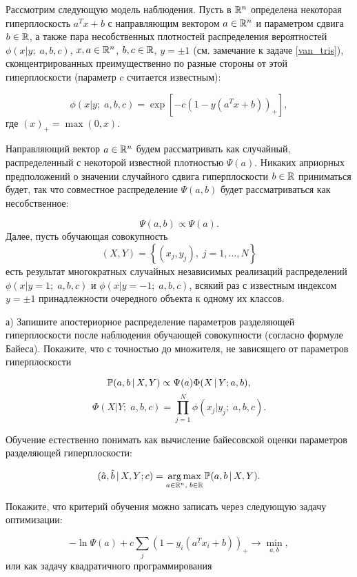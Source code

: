 \begin{problem}

Рассмотрим следующую модель наблюдения. Пусть в ${\rm {\mathbb R}}^{n} $ определена некоторая гиперплоскость $a^{T} x+b$ с направляющим вектором $a\in {\rm {\mathbb R}}^{n} $ и параметром сдвига $b\in {\rm {\mathbb R}}$, а также пара несобственных плотностей распределения вероятностей $\phi (x|y;\; a,b,c)$, $x,a\in {\rm {\mathbb R}}^{n} $, $b,c\in {\rm {\mathbb R}}$, $y=\pm 1$ (см. замечание к задаче \ref{van_tris}), сконцентрированных преимущественно по разные стороны от этой гиперплоскости (параметр $c$ считается известным): 

\[
\phi (x|y;\; a,b,c)=\exp \left[-c\left(1-y(a^{T} x+b)\right)_{+} \right],
\]
где $(x)_{+} = \max(0, x)$. 


Направляющий вектор $a\in {\rm {\mathbb R}}^{n} $ будем рассматривать как случайный, распределенный с некоторой известной плотностью $\Psi (a)$. Никаких априорных предположений о значении случайного сдвига гиперплоскости $b\in {\rm {\mathbb R}}$ приниматься будет, так что совместное распределение $\Psi (a,b)$ будет рассматриваться как несобственное: 

\[
\Psi (a,b)\propto \Psi (a).  
\] 
Далее, пусть обучающая совокупность \[(X,Y) = \left\{(x_{j} ,y_{j} ), \; j=1,...,N\right\}\] есть результат многократных случайных независимых реализаций распределений $\phi (x|y=1;\; a,b,c)$ и $\phi (x|y=-1;\; a,b,c)$, всякий раз с известным индексом $y=\pm 1$ принадлежности очередного объекта к одному их классов. 

а) Запишите апостериорное распределение параметров разделяющей гиперплоскости после наблюдения обучающей совокупности (согласно формуле Байеса). Покажите, что с точностью до множителя, не зависящего от параметров гиперплоскости

\[\mathrm{{\mathbb P}}(a,b\, |\, X,Y)\propto \Psi (a)\Phi (X\, |\, Y;a,b),\] 
\[\Phi (X|Y;\; a,b,c)=\prod _{j=1}^{N}\phi (x_{j} |y_{j} ;\; a,b,c).\]

Обучение естественно понимать как вычисление байесовской оценки параметров разделяющей гиперплоскости: 

\[(\hat{a},\hat{b}\, |\, X,Y;c)=\mathop{\arg \max }\limits_{a\in {\rm {\mathbb R}}^{n} ,\; b\in {\rm {\mathbb R}}} \mathrm{{\mathbb P}}(a,b\, |\, X,Y).\] 

Покажите, что критерий обучения можно записать через следующую задачу оптимизации:

\[
-\ln \Psi (a)+ c \sum_{j} \left(1-y_i(a^{T} x_i+b)\right)_{+} \to \min_{a,b},
\] 
или как задачу квадратичного программирования


\end{problem}
